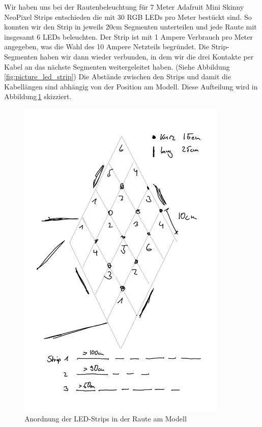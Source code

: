             Wir haben uns bei der Rautenbeleuchtung für 7 Meter Adafruit Mini Skinny NeoPixel Strips entschieden die mit 30 RGB LEDs pro Meter bestückt sind. So konnten wir den Strip in jeweils 20cm Segmenten unterteilen und jede Raute mit insgesamt 6 LEDs beleuchten.
            Der Strip ist mit 1 Ampere Verbrauch pro Meter angegeben, was die Wahl des 10 Ampere Netzteils begründet.
            Die Strip-Segmenten haben wir dann wieder verbunden, in dem wir die drei Kontakte per Kabel an das nächste Segmenten weitergeleitet haben. (Siehe Abbildung\,\ref{fig:picture_led_strip}) Die Abstände zwischen den Strips und damit die Kabellängen sind abhängig von der Position am Modell.
            Diese Aufteilung wird in Abbildung\,\ref{fig:led_wiring_rhombus} skizziert.

            \begin{figure}[H]
                \begin{center}
                    \includegraphics[width=10cm]{media/03_technical_implementation/leds_3.png}
                \end{center}
                \caption{Anordnung der LED-Strips in der Raute am Modell}
                \label{fig:led_wiring_rhombus}
            \end{figure}
            
